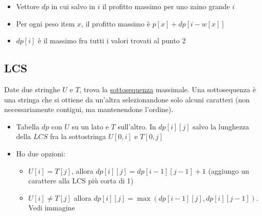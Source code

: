 \vskip3mm\vskip3mm
\begin{itemize}
	\item Vettore $ dp $ in cui salvo in $ i $ il profitto massimo per uno zaino grande $ i $
	\item Per ogni peso item $ x $, il profitto massimo è $ p\left[x\right] + dp\left[i - w\left[x\right]\right] $
	\item $ dp\left[i\right] $ è il massimo fra tutti i valori trovati al punto 2
\end{itemize}
\subsection{LCS}
Date due stringhe $ U $ e $ T $, trova la \underline{sottosequenza} massimale. Una sottosequenza è una stringa che si ottiene da un'altra selezionandone solo alcuni caratteri (non necessariamente contigui, ma mantenendone l'ordine).
\vskip3mm\vskip3mm
\begin{itemize}
	\item Tabella $ dp $ con $ U $ su un lato e $ T $ sull'altro. In $ dp\left[i\right]\left[j\right] $ salvo la lunghezza della $ LCS $ fra la sottostringa $ U\left[0,i\right] $ e $ T\left[0, j\right] $
	\item Ho due opzioni:
	      \begin{itemize}
		      \item $ U\left[i\right] = T[j] $, allora $ dp\left[i\right]\left[j\right] = dp\left[i-1\right]\left[j-1\right] +1 $ (aggiungo un carattere alla LCS più corta di 1)
		      \item $  U\left[i\right] \neq T[j] $  allora $ dp\left[i\right]\left[j\right] = \operatorname{max}\left(dp\left[i-1\right]\left[j\right], dp\left[i\right]\left[j-1\right]\right) $. Vedi immagine
	      \end{itemize}
\end{itemize}

